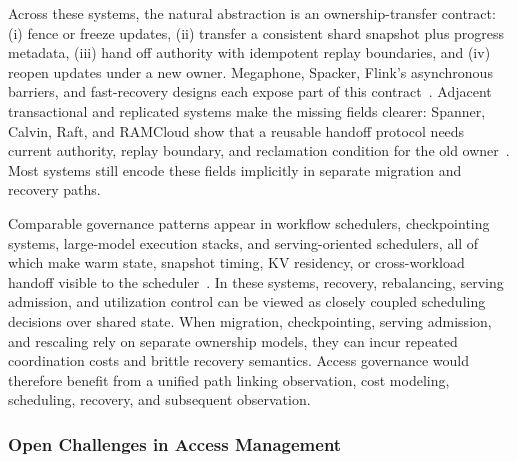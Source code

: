 \documentclass[manuscript]{acmart}
\begin{document}
Across these systems, the natural abstraction is an ownership-transfer contract: (i) fence or freeze updates, (ii) transfer a consistent shard snapshot plus progress metadata, (iii) hand off authority with idempotent replay boundaries, and (iv) reopen updates under a new owner. Megaphone, Spacker, Flink's asynchronous barriers, and fast-recovery designs each expose part of this contract~\cite{nasir2019megaphone,mao2025spacker,carbone2015asynchronous,zhao2024recovery}. Adjacent transactional and replicated systems make the missing fields clearer: Spanner, Calvin, Raft, and RAMCloud show that a reusable handoff protocol needs current authority, replay boundary, and reclamation condition for the old owner~\cite{corbett2012spanner,thomson2012calvin,ongaro2014raft,ousterhout2011ramcloud}. Most systems still encode these fields implicitly in separate migration and recovery paths.

Comparable governance patterns appear in workflow schedulers, checkpointing systems, large-model execution stacks, and serving-oriented schedulers, all of which make warm state, snapshot timing, KV residency, or cross-workload handoff visible to the scheduler~\cite{mahgoub2021sonic,mahgoub2022orion,zhao2025rtsfaas,wan2025bytecheckpoint,huang2025flowcheck,lian2025universal,lin2025weipipe,liu2025mario,hong2025sola,oh2024exegpt,wang2025sirius}. In these systems, recovery, rebalancing, serving admission, and utilization control can be viewed as closely coupled scheduling decisions over shared state. When migration, checkpointing, serving admission, and rescaling rely on separate ownership models, they can incur repeated coordination costs and brittle recovery semantics. Access governance would therefore benefit from a unified path linking observation, cost modeling, scheduling, recovery, and subsequent observation.



\subsubsection{Open Challenges in Access Management}
\end{document}
